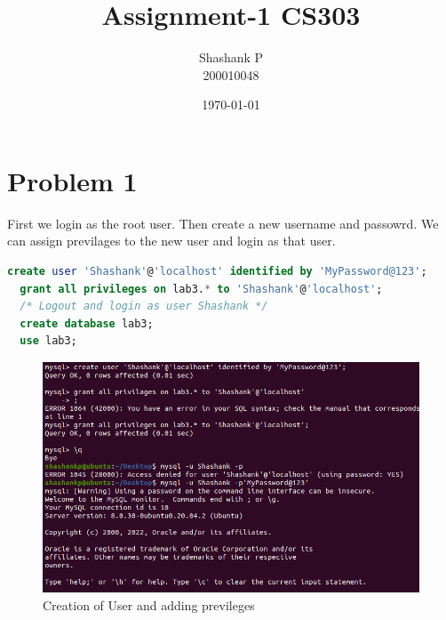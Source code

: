 \documentclass{article}
\title{Assignment-1 CS303}
\author{Shashank P \\ 200010048}
\date{\today}
\begin{document}
\maketitle




\section{Problem 1}
First we login as the root user. Then create a new username and passowrd.
We can assign previlages to the new user and login as that user.
\begin{lstlisting}[language=sql]
  create user 'Shashank'@'localhost' identified by 'MyPassword@123';
  grant all privileges on lab3.* to 'Shashank'@'localhost';
  /* Logout and login as user Shashank */
  create database lab3;
  use lab3;
\end{lstlisting}
\begin{figure}[!ht]
  \begin{center}
  \includegraphics[scale=0.8]{new_user_1.png}
  \caption{Creation of User and adding previleges}
  \end{center}
\end{figure}
\end{document}
